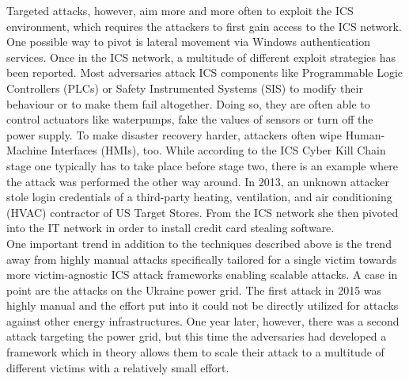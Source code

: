 \documentclass[runningheads]{llncs}
\begin{document}
Targeted attacks, however, aim more and more often to exploit the ICS environment, which requires the attackers to first gain access to the ICS network.
One possible way to pivot is lateral movement via Windows authentication services.
Once in the ICS network, a multitude of different exploit strategies has been reported.
Most adversaries attack ICS components like Programmable Logic Controllers (PLCs) or Safety Instrumented Systems (SIS) to modify their behaviour or to make them fail altogether.
Doing so, they are often able to control actuators like waterpumps, fake the values of sensors or turn off the power supply.
To make disaster recovery harder, attackers often wipe Human-Machine Interfaces (HMIs), too.
While according to the ICS Cyber Kill Chain stage one typically has to take place before stage two, there is an example where the attack was performed the other way around.
In 2013, an unknown attacker stole login credentials of a third-party heating, ventilation, and air conditioning (HVAC) contractor of US Target Stores.
From the ICS network she then pivoted into the IT network in order to install credit card stealing software. \cite{hemsley.18}\\
One important trend in addition to the techniques described above is the trend away from highly manual attacks specifically tailored for a single victim towards more victim-agnostic ICS attack frameworks enabling scalable attacks.
A case in point are the attacks on the Ukraine power grid.
The first attack in 2015 was highly manual and the effort put into it could not be directly utilized for attacks against other energy infrastructures.
One year later, however, there was a second attack targeting the power grid, but this time the adversaries had developed a framework which in theory allows them to scale their attack to a multitude of different victims with a relatively small effort. \cite{greenberg.17}
\end{document}
